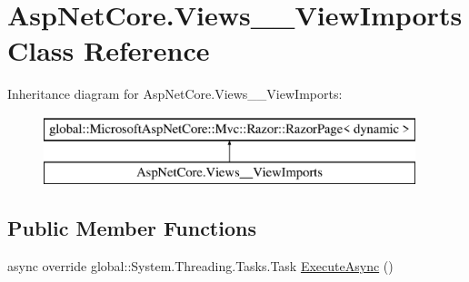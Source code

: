 \hypertarget{class_asp_net_core_1_1_views_____view_imports}{}\section{Asp\+Net\+Core.\+Views\+\_\+\+\_\+\+View\+Imports Class Reference}
\label{class_asp_net_core_1_1_views_____view_imports}
Inheritance diagram for Asp\+Net\+Core.\+Views\+\_\+\+\_\+\+View\+Imports\+:\begin{figure}[H]
\begin{center}
\leavevmode
\includegraphics[height=2.000000cm]{class_asp_net_core_1_1_views_____view_imports}
\end{center}
\end{figure}
\subsection*{Public Member Functions}
\begin{DoxyCompactItemize}
\item 
async override global\+::\+System.\+Threading.\+Tasks.\+Task \mbox{\hyperlink{class_asp_net_core_1_1_views_____view_imports_afb0fbe4d2cff8ff940fd8555b3f3c64e}{Execute\+Async}} ()
\end{DoxyCompactItemize}

